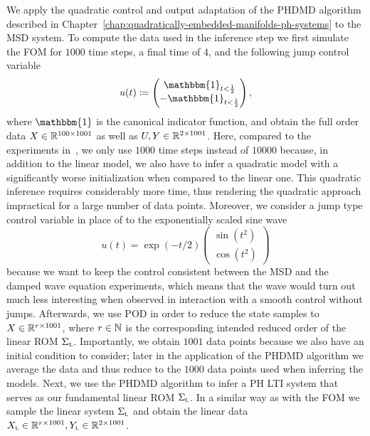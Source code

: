 We apply the quadratic control and output adaptation of the \ac{PHDMD} algorithm described in Chapter~\ref{chap:quadratically-embedded-manifolds-ph-systems} to the \ac{MSD} system.
To compute the data used in the inference step we first simulate the \ac{FOM} for $1000$ time steps, a final time of $4$, and the following jump control variable
\begin{equation*}
    u(t) \coloneqq \begin{pmatrix}
        \mathbbm{1}_{t < \frac{1}{2}} \\
        - \mathbbm{1}_{t < \frac{1}{2}}
    \end{pmatrix},
\end{equation*}
where $\mathbbm{1}$ is the canonical indicator function, and obtain the full order data $X \in \mathbb{R}^{100 \times 1001}$ as well as $U, Y \in \mathbb{R}^{2 \times 1001}$.
Here, compared to the experiments in~\cite{Morandin2023}, we only use $1000$ time steps instead of $10000$ because, in addition to the linear model, we also have to infer a quadratic model with a significantly worse initialization when compared to the linear one.
This quadratic inference requires considerably more time, thus rendering the quadratic approach impractical for a large number of data points.
Moreover, we consider a jump type control variable in place of to the exponentially scaled sine wave
\begin{equation*}
    u(t) = \exp{(-t/2)} \begin{pmatrix}
        \sin{(t^2)} \\
        \cos{(t^2)}
    \end{pmatrix}
\end{equation*}
because we want to keep the control consistent between the \ac{MSD} and the damped wave equation experiments, which means that the wave would turn out much less interesting when observed in interaction with a smooth control without jumps.
Afterwards, we use \ac{POD} in order to reduce the state samples to $X \in \mathbb{R}^{r \times 1001}$, where $r \in \mathbb{N}$ is the corresponding intended reduced order of the linear \ac{ROM} $\Sigma_{\textnormal{\scshape l}}$.
Importantly, we obtain $1001$ data points because we also have an initial condition to consider; later in the application of the \ac{PHDMD} algorithm we average the data and thus reduce to the $1000$ data points used when inferring the models.
Next, we use the \ac{PHDMD} algorithm to infer a \ac{PH} \ac{LTI} system that serves as our fundamental linear \ac{ROM} $\Sigma_{\textnormal{\scshape l}}$.
In a similar way as with the \ac{FOM} we sample the linear system $\Sigma_{\textnormal{\scshape l}}$ and obtain the linear data $X_{\textnormal{\scshape l}} \in \mathbb{R}^{r \times 1001}, Y_{\textnormal{\scshape l}} \in \mathbb{R}^{2 \times 1001}$.
